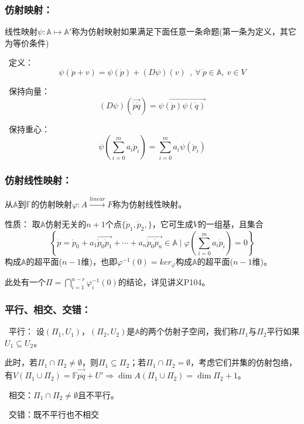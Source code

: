 \documentclass[zihao=5,UTF8]{report}
\def\F{\mathbb{F}}
\def\A{\mathbb{A}}
\theoremstyle{mystyle} %
\begin{document}
\subsubsection{仿射映射：}
线性映射$\psi: \A \longmapsto \A'$称为仿射映射如果满足下面任意一条命题(第一条为定义，其它为等价条件)
\par{}\  定义：
\begin{equation*}
    \psi(\dot{p}+v) = \psi(\dot{p}) + (D\psi)(v) \ \ ,\ \forall\ \dot{p}\in \A,\ v \in V
\end{equation*}   \par
{}\   保持向量：
\begin{equation*}
    (D\psi)(\overrightarrow{\dot{p}\dot{q}}) = \overrightarrow{\psi(\dot{p})\psi(\dot{q})}
\end{equation*}  \par
{}\  保持重心：
\begin{equation*}
    \psi\left(\sum_{i=0}^{m} a_i\dot{p}_i \right) = \sum_{i=0}^{m} a_i\psi(\dot{p}_i)
\end{equation*} 


\subsubsection{仿射线性映射：}
从$\A$到$\F$的仿射映射$\varphi: A \overset{linear}{\longrightarrow} F$称为仿射线性映射。\par
性质：
取$\A$仿射无关的$n+1$个点$\{\dot{p}_1,\dot{p}_2,\}$，它可生成$V$的一组基，且集合
\begin{equation*}
    \left\{ \dot{p} = \dot{p}_0 + a_1\overrightarrow{\dot{p}_0\dot{p}_1} + \cdots + a_n\overrightarrow{\dot{p}_0\dot{p}_n} \in \A \mid \varphi(\sum_{i=0}^{m} a_i\dot{p}_i) = 0 \right\}
\end{equation*}
构成$\A$的超平面($n-1$维)，也即$\varphi^{-1}(0)= ker_\varphi $构成$\A$的超平面($n-1$维)。
{\par\color{gray}\small
此处有一个$\Pi  = \bigcap_{i=1}^{n-r}\varphi^{-1}_i(0) $的结论，详见讲义P104。
\par}

\subsubsection{平行、相交、交错：}
\par{}\ 平行： 设$(\Pi_1, U_1)$，$(\Pi_2, U_2)$是$\A$的两个仿射子空间，我们称$\Pi_1$与$\Pi_2$平行如果$U_1 \subseteq U_2$。\par
此时，若$\Pi_1 \cap \Pi_2 \ne \emptyset$，则$\Pi_1 \subseteq \Pi_2$；若$\Pi_1 \cap \Pi_2 = \emptyset$，考虑它们并集的仿射包络，有$V(\Pi_1\cup\Pi_2 ) = \F\overrightarrow{\dot{p}\dot{q}} + U' \Longrightarrow \dim A(\Pi_1\cup\Pi_2 ) = \dim \Pi_2 + 1$。\par   \par
{}\  相交：$\Pi_1 \cap \Pi_2 \ne \emptyset$且不平行。   \par
{}\  交错：既不平行也不相交 \par
\end{document}
